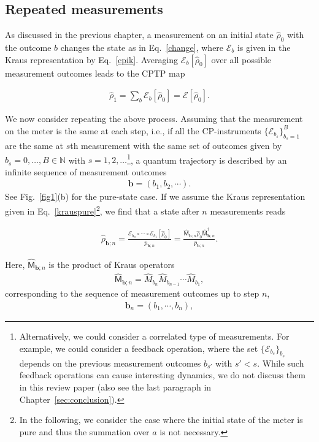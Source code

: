 \documentclass[preprint,pteplogo]{ptephy_v2}%
\numberwithin{equation}{section}
\theoremstyle{definition}
\newcommand{\ml}[1]{\mathcal{#1}}
\newcommand{\mbb}[1]{\mathbb{#1}}
\newcommand{\aln}[1]{
\begin{align}
#1
\end{align}
}
\begin{document}
\subsection{Repeated measurements}
As discussed in the previous chapter, a measurement on an initial state $\hat{\rho}_0$ with the outcome $b$ changes the state as in Eq.~\eqref{change}, where $\ml{E}_b$ is given in the Kraus representation by Eq.~\eqref{cpik}.
Averaging $\ml{E}_b[\hat{\rho}_0]$ over all possible measurement outcomes leads to the CPTP map 
\aln{
\hat{\rho}_1
=\sum_b\ml{E}_b[\hat{\rho}_0]=\ml{E}[\hat{\rho}_0].
}

We now consider repeating the above process. 
Assuming that the measurement on the meter is the same at each step, i.e., if all the CP-instruments $\{\ml{E}_{b_s}\}_{b_s=1}^B$ are the same at $s$th measurement with the same set of outcomes given by $b_s=0,\dots, B\in\mbb{N}$ with $s=1,2,\ldots$\footnote{Alternatively, we could consider a  correlated type of measurements. For example, we could consider a feedback operation, where the set $\{\ml{E}_{b_s}\}_{b_s}$ depends on the previous measurement outcomes $b_{s'}$ with $s'<s$. While such feedback operations can cause interesting dynamics, we do not discuss them in this review paper (also see the last paragraph in Chapter~\ref{sec:conclusion}).}, a quantum trajectory is described by an infinite sequence of measurement outcomes 
\begin{align}
 \bm{b}=(b_1,b_2,\cdots).
\label{eq:outcome-sequence_infinite}
\end{align} 
See Fig.~\ref{fig1}(b) for the pure-state case. 
If we assume the Kraus representation given in Eq.~\eqref{krauspure}\footnote{
In the following, we consider the case where the initial state of the meter is pure and thus the summation over $a$ is not necessary.
}, we find that a state after $n$ measurements reads
\aln{\label{qtmixed}
\hat{\rho}_{\bm{b};n}=\frac{\ml{E}_{b_n}\circ\cdots \circ\ml{E}_{b_1}[\hat{\rho}_0]}{p_{\bm{b};n}}=\frac{\hat{\mathsf{M}}_{\bm{b};n}\hat{\rho}_0\hat{\mathsf{M}}_{\bm{b};n}^\dagger}{p_{\bm{b};n}}.
}
Here, $\hat{\mathsf{M}}_{\bm{b};n}$ is the product of Kraus operators 
\begin{align}
  \hat{\mathsf{M}}_{\bm{b};n}=\hat{M}_{b_n}\hat{M}_{b_{n-1}}\cdots\hat{M}_{b_1},
  \label{eq:product_Kraus-operators}
\end{align}
corresponding to the sequence of measurement outcomes up to step $n$,
\begin{align}
\bm{b}_n=(b_1,\cdots,b_n),
\label{eq:outcome-sequence_finite}
\end{align}
\end{document}
